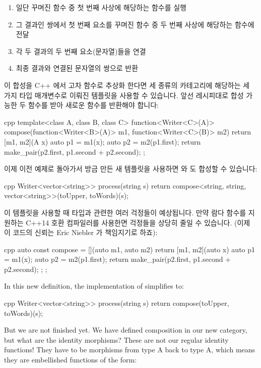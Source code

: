 \begin{enumerate}
\tightlist
\item
  일단 꾸며진 함수 중 첫 번째 사상에 해당하는 함수를 실행
\item
  그 결과인 쌍에서 첫 번째 요소를 꾸며진 함수 중 두 번째 사상에 해당하는 함수에 전달
\item
  각 두 결과의 두 번째 요소(문자열)들을 연결
\item
  최종 결과와 연결된 문자열의 쌍으로 반환
\end{enumerate}

이 합성을 C++ 에서 고차 함수로 추상화 한다면 세 종류의 카테고리에 해당하는 세 가지 타입
매개변수로 이뤄진 템플릿을 사용할 수 있습니다. 앞선 레시피대로 합성 가능한 두 함수를 받아
새로운 함수를 반환해야 합니다:

\begin{snip}{cpp}
template<class A, class B, class C>
function<Writer<C>(A)> compose(function<Writer<B>(A)> m1,
                               function<Writer<C>(B)> m2)
{
    return [m1, m2](A x) {
        auto p1 = m1(x);
        auto p2 = m2(p1.first);
        return make_pair(p2.first, p1.second + p2.second); 
    };
}
\end{snip}
이제 이전 예제로 돌아가서 방금 만든 새 템플릿을 사용하면 와
도 합성할 수 있습니다:

\begin{snip}{cpp}
Writer<vector<string>> process(string s) { 
    return compose<string, string, vector<string>>(toUpper, toWords)(s);
}
\end{snip}
이  템플릿을 사용할 때 타입과 관련한 여러 걱정들이 예상됩니다. 만약 람다
함수를 지원하는 C++14 호환 컴파일러를 사용한면 걱정들을 상당히 줄일 수 있습니다.
(이제 이 코드의 신뢰는 Eric Niebler 가 책임지기로 하죠):

\begin{snip}{cpp}
auto const compose = [](auto m1, auto m2) { 
    return [m1, m2](auto x) { 
        auto p1 = m1(x);
        auto p2 = m2(p1.first);
        return make_pair(p2.first, p1.second + p2.second);
    };
};
\end{snip}
In this new definition, the implementation of 
simplifies to:

\begin{snip}{cpp}
Writer<vector<string>> process(string s) {
    return compose(toUpper, toWords)(s);
}
\end{snip}
But we are not finished yet. We have defined composition in our new
category, but what are the identity morphisms? These are not our regular
identity functions! They have to be morphisms from type A back to type
A, which means they are embellished functions of the form:

